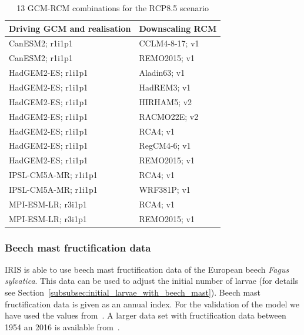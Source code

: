 \documentclass[a4paper, 11pt]{scrartcl}
\begin{document}
\begin{table}[h!]
\caption{13 GCM-RCM combinations for the RCP8.5 scenario}
\label{tab:climate_models}
\begin{tabularx}{\textwidth}{ll}
\toprule
\textbf{Driving GCM and realisation}  & \textbf{Downscaling RCM} 	\\
\midrule
CanESM2; r1i1p1 				 	  & CCLM4-8-17; v1  		 	\\
CanESM2; r1i1p1 				 	  & REMO2015; v1 				\\
HadGEM2-ES; r1i1p1 					  & Aladin63; v1 				\\
HadGEM2-ES; r1i1p1 					  & HadREM3; v1 				\\
HadGEM2-ES; r1i1p1 					  & HIRHAM5; v2 				\\
HadGEM2-ES; r1i1p1 					  & RACMO22E; v2 				\\
HadGEM2-ES; r1i1p1 					  & RCA4; v1 					\\
HadGEM2-ES; r1i1p1 					  & RegCM4-6; v1 				\\
HadGEM2-ES; r1i1p1 					  & REMO2015; v1 				\\
IPSL-CM5A-MR; r1i1p1 				  & RCA4; v1 					\\
IPSL-CM5A-MR; r1i1p1 				  & WRF381P; v1 				\\
MPI-ESM-LR; r3i1p1 					  & RCA4; v1 					\\
MPI-ESM-LR; r3i1p1 					  & REMO2015; v1 				\\
\bottomrule
\end{tabularx}
\end{table}


\subsubsection{Beech mast fructification data}\label{subsubsec:beech_mast_data}
IRIS is able to use beech mast fructification data of the European beech \textit{Fagus sylvatica}. This data can be used to adjust the initial number of larvae (for details see Section~\ref{subsubsec:initial_larvae_with_beech_mast}). Beech mast fructification data is given as an annual index. For the validation of the model we have used the values from~\cite{Brugger.2018}. A larger data set with fructification data between 1954 an 2016 is available from~\cite{Konnert.2016}.
\end{document}
